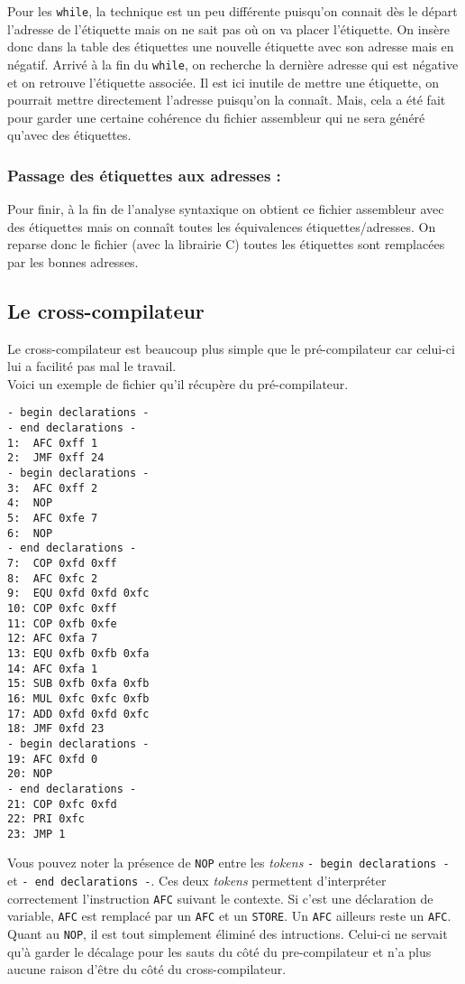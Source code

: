 Pour les \texttt{while}, la technique est un peu différente puisqu’on connait dès le départ l’adresse de l’étiquette mais on ne sait pas où on va placer l’étiquette. On insère donc dans la table des étiquettes une nouvelle étiquette avec son adresse mais en négatif. Arrivé à la fin du \texttt{while}, on recherche la dernière adresse qui est négative et on retrouve l’étiquette associée. Il est ici inutile de mettre une étiquette, on pourrait mettre directement l’adresse puisqu’on la connaît. Mais, cela a été fait pour garder une certaine cohérence du fichier assembleur qui ne sera généré qu’avec des étiquettes.

\subsubsection*{Passage des étiquettes aux adresses :}

Pour finir, à la fin de l’analyse syntaxique on obtient ce fichier assembleur avec des étiquettes mais on connaît toutes les équivalences étiquettes/adresses. On reparse donc le fichier (avec la librairie C) toutes les étiquettes sont remplacées par les bonnes adresses.

\subsection{Le cross-compilateur}

Le cross-compilateur est beaucoup plus simple que le pré-compilateur car celui-ci lui a facilité pas mal le travail.\\

Voici un exemple de fichier qu'il récupère du pré-compilateur.
\begin{lstlisting}
- begin declarations -
- end declarations -
1:	AFC 0xff 1
2:	JMF 0xff 24
- begin declarations -
3:	AFC 0xff 2
4:	NOP
5:	AFC 0xfe 7
6:	NOP
- end declarations -
7:	COP 0xfd 0xff
8:	AFC 0xfc 2
9:	EQU 0xfd 0xfd 0xfc
10:	COP 0xfc 0xff
11:	COP 0xfb 0xfe
12:	AFC 0xfa 7
13:	EQU 0xfb 0xfb 0xfa
14:	AFC 0xfa 1
15:	SUB 0xfb 0xfa 0xfb
16:	MUL 0xfc 0xfc 0xfb
17:	ADD 0xfd 0xfd 0xfc
18:	JMF 0xfd 23
- begin declarations -
19:	AFC 0xfd 0
20:	NOP
- end declarations -
21:	COP 0xfc 0xfd
22:	PRI 0xfc
23:	JMP 1
\end{lstlisting}

Vous pouvez noter la présence de \texttt{NOP} entre les \textit{tokens} \texttt{- begin declarations -} et \texttt{- end declarations -}. Ces deux \textit{tokens} permettent d'interpréter correctement l'instruction \texttt{AFC} suivant le contexte. Si c'est une déclaration de variable, \texttt{AFC} est remplacé par un \texttt{AFC} et un \texttt{STORE}. Un \texttt{AFC} ailleurs reste un \texttt{AFC}. Quant au \texttt{NOP}, il est tout simplement éliminé des intructions. Celui-ci ne servait qu'à garder le décalage pour les sauts du côté du pre-compilateur et n'a plus aucune raison d'être du côté du cross-compilateur.

